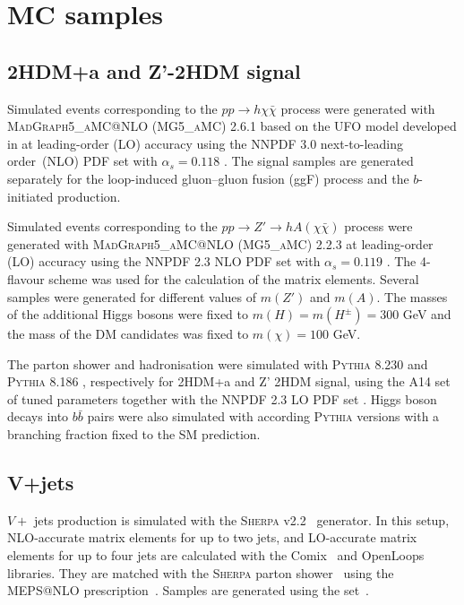 \section{MC samples}
\label{ch:data-mc-samples}
\subsection{2HDM+a and Z'-2HDM signal}
\label{subsec:signal}
\par Simulated events corresponding to the $pp\to h\chi\bar{\chi}$ process were generated with \textsc{MadGraph5\_aMC@NLO} (\textsc{MG5\_aMC}) 2.6.1 \cite{Alwall:2014hca} 
based on the UFO model developed in \cite{Abe:2018bpo} at leading-order (LO) accuracy using the NNPDF 3.0 next-to-leading order~(NLO) PDF set with $\alpha_s=0.118$ \cite{Ball:2014uwa}. 
The signal samples are generated separately for the loop-induced gluon--gluon fusion (ggF) process and the $b$-initiated production. 
\par Simulated events corresponding to the $pp\to Z'\to h A(\chi\bar{\chi})$ process were generated with \textsc{MadGraph5\_aMC@NLO} (\textsc{MG5\_aMC}) 2.2.3 \cite{Alwall:2014hca} 
at leading-order (LO) accuracy using the NNPDF 2.3 NLO PDF set with $\alpha_s=0.119$ \cite{Ball:2012cx}. 
The 4-flavour scheme was used for the calculation of the matrix elements. Several samples were generated for different values of $m(Z')$ and $m(A)$.
The masses of the additional Higgs bosons were fixed to $m(H)=m(H^{\pm})=300$ GeV and the mass of the DM candidates was fixed to $m(\chi)=100$ GeV. 

\par The parton shower and hadronisation were simulated with \textsc{Pythia} 8.230 \cite{Sjostrand:2014zea} and \textsc{Pythia} 8.186 \cite{Sjostrand:2007gs}, respectively for 2HDM+a and Z' 2HDM signal,
using the A14 set \cite{ATL-PHYS-PUB-2014-021} of tuned parameters together with the NNPDF 2.3 LO PDF set \cite{Ball:2011mu}. 
Higgs boson decays into $b\bar{b}$ pairs were also simulated with according \textsc{Pythia} versions with a branching fraction fixed to the SM prediction.

\subsection{V+jets}
\par $V+$ jets production is simulated with the
\textsc{Sherpa} v2.2~\cite{Bothmann:2019yzt} generator. In this setup, NLO-accurate
matrix elements for up to two jets, and LO-accurate matrix elements for up
to four jets are calculated with the Comix~\cite{Gleisberg:2008fv} and
OpenLoops~\cite{Cascioli:2011va,Denner:2016kdg} libraries. They are matched
with the \textsc{Sherpa} parton shower~\cite{Schumann:2007mg} using the MEPS@NLO
prescription~\cite{Hoeche:2011fd,Hoeche:2012yf,Catani:2001cc,Hoeche:2009rj}.
Samples are generated using the
\nnpdfnnlo set~\cite{Ball:2014uwa}.

